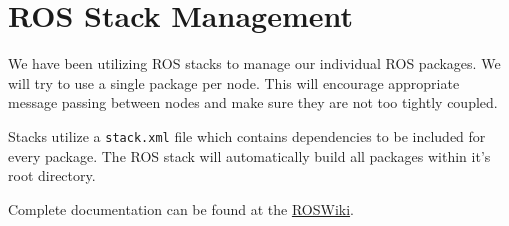 \section{ROS Stack Management}

We have been utilizing ROS stacks to manage our individual ROS packages.
We will try to use a single package per node. This will encourage
appropriate message passing between nodes and make sure they are not too
tightly coupled.

Stacks utilize a \texttt{stack.xml} file which contains dependencies to
be included for every package. The ROS stack will automatically build
all packages within it's root directory.

Complete documentation can be found at the
\href{http://www.ros.org/wiki/Stacks}{ROSWiki}.
